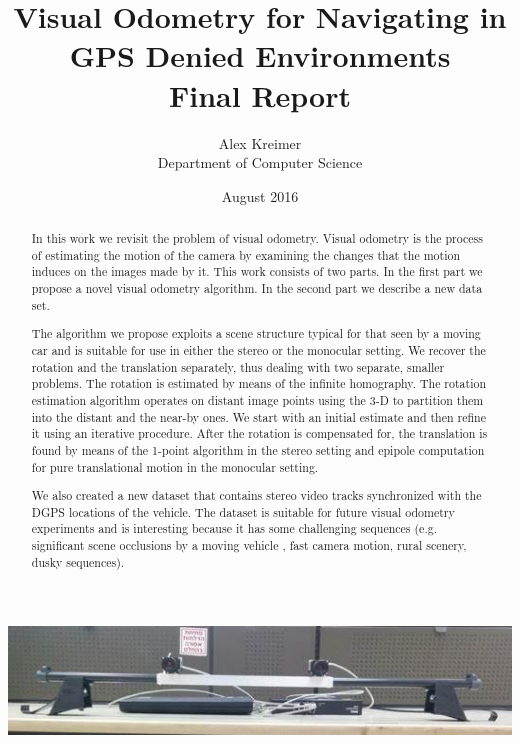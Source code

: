 \documentclass{report}
\title{%
 Visual Odometry for Navigating in GPS Denied Environments\\[1in]
  \large Final Report}
\date {August 2016}
\author{Alex Kreimer \\[1in] Department of Computer Science }
\begin{document}
\makeatletter
\begin{titlepage}
  \begin{center}
    \includegraphics[width=0.7\linewidth]{title_cams}\\[4ex]
    {\huge \bfseries  \@title }\\[4ex] 
    {\LARGE  \@author}\\[50ex] 
  \end{center}
\end{titlepage}
\makeatother
\thispagestyle{empty}
\newpage

\begin{abstract}
  In this work we revisit the problem of visual odometry. Visual
  odometry is the process of estimating the motion of the camera by
  examining the changes that the motion induces on the images made by
  it. This work consists of two parts. In the first part we propose a
  novel visual odometry algorithm.  In the second part we describe a
  new data set.

  The algorithm we propose exploits a scene structure typical for that
  seen by a moving car and is suitable for use in either the stereo or
  the monocular setting.  We recover the rotation and the translation
  separately, thus dealing with two separate, smaller problems. The
  rotation is estimated by means of the infinite homography. The
  rotation estimation algorithm operates on distant image points using
  the 3-D to partition them into the distant and the near-by ones. We
  start with an initial estimate and then refine it using an iterative
  procedure. After the rotation is compensated for, the translation is
  found by means of the 1-point algorithm in the stereo setting and
  epipole computation for pure translational motion in the monocular
  setting.

  We also created a new dataset that contains stereo video tracks
  synchronized with the DGPS locations of the vehicle.  The dataset is
  suitable for future visual odometry experiments and is interesting
  because it has some challenging sequences (e.g. significant scene
  occlusions by a moving vehicle , fast camera motion, rural scenery,
  dusky sequences).
\end{abstract}

\tableofcontents{}
\end{document}
